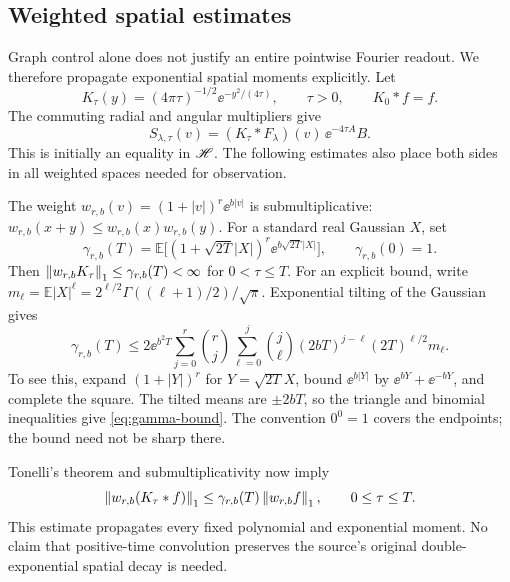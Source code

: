 \subsection{Weighted spatial estimates}

Graph control alone does not justify an entire pointwise Fourier
readout. We therefore propagate exponential spatial moments explicitly.
Let
\begin{equation}
 K_\tau(y)=(4\pi\tau)^{-1/2}\ee^{-y^2/(4\tau)},\qquad \tau>0,
 \qquad K_0*f=f.
 \label{eq:heat-kernel}
\end{equation}
The commuting radial and angular multipliers give
\begin{equation}
 S_{\lambda,\tau}(v)
 =(K_\tau*F_\lambda)(v)\,\ee^{-4\tau A}B.
 \label{eq:heat-factorization}
\end{equation}
This is initially an equality in $\mathscr H$. The following estimates also
place both sides in all weighted spaces needed for observation.

The weight $w_{r,b}(v)=(1+|v|)^r\ee^{b|v|}$ is submultiplicative:
$w_{r,b}(x+y)\le w_{r,b}(x)w_{r,b}(y)$. For a standard real Gaussian
$X$, set
\begin{equation}
 \gamma_{r,b}(T)=
 \mathbb E\bigl[(1+\sqrt{2T}|X|)^r\ee^{b\sqrt{2T}|X|}\bigr],
 \qquad \gamma_{r,b}(0)=1.
 \label{eq:gamma}
\end{equation}
Then $\left\lVert w_{r,b}K_\tau\right\rVert_1\le\gamma_{r,b}(T)<\infty$ for
$0<\tau\le T$. For an explicit bound, write
$m_\ell=\mathbb E|X|^\ell
=2^{\ell/2}\Gamma((\ell+1)/2)/\sqrt\pi$. Exponential tilting of
the Gaussian gives
\begin{equation}
 \gamma_{r,b}(T)\le2\ee^{b^2T}
 \sum_{j=0}^r\binom rj\sum_{\ell=0}^j\binom j\ell
 (2bT)^{j-\ell}(2T)^{\ell/2}m_\ell.
 \label{eq:gamma-bound}
\end{equation}
To see this, expand $(1+|Y|)^r$ for $Y=\sqrt{2T}X$, bound
$\ee^{b|Y|}$ by $\ee^{bY}+\ee^{-bY}$, and complete the square.
The tilted means are $\pm2bT$, so the triangle and binomial inequalities
give \eqref{eq:gamma-bound}. The convention $0^0=1$ covers the endpoints;
the bound need not be sharp there.

Tonelli's theorem and submultiplicativity now imply
\begin{equation}
 \left\lVert w_{r,b}(K_\tau*f)\right\rVert_1
 \le\gamma_{r,b}(T)\left\lVert w_{r,b}f\right\rVert_1,
 \qquad 0\le\tau\le T.
 \label{eq:weighted-convolution}
\end{equation}
This estimate propagates every fixed polynomial and exponential
moment. No claim that positive-time convolution preserves the source's
original double-exponential spatial decay is needed.

